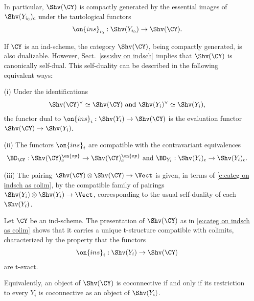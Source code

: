 \documentclass[9pt]{amsart}
\theoremstyle{definition}
\theoremstyle{remark}
\newcommand{\secref}[1]{Sect.~\ref{#1}}
\numberwithin{equation}{section}
\begin{document}
In particular, $\Shv(\CY)$ is compactly generated by the essential images of $\Shv(Y_{i_0})_c$ under the tautological
functors
$$\on{ins}_{i_0}:\Shv(Y_{i_0})\to \Shv(\CY).$$

\sssec{}  \label{sss:duality}

If $\CY$ is an ind-scheme, the category $\Shv(\CY)$, being compactly generated, is also dualizable. However,
\secref{sss:shv on indsch} implies that $\Shv(\CY)$ is canonically self-dual. This self-duality can be described 
in the following equivalent ways:

\medskip

\noindent(i) Under the identifications 
$$\Shv(\CY)^\vee\simeq \Shv(\CY) \text{ and }\Shv(Y_i)^\vee\simeq \Shv(Y_i),$$ 
the functor dual to $\on{ins}_i:\Shv(Y_i)\to \Shv(\CY)$ is the evaluation functor $\Shv(\CY)\to \Shv(Y_i)$.

\medskip

\noindent(ii) The functors $\on{ins}_i$ are compatible with the contravariant equivalences
$$\BD_\CY:\Shv(\CY)^{\on{op}}_c\to \Shv(\CY)^{\on{op}}_c \text{ and } \BD_{Y_i}:\Shv(Y_i)_c\to \Shv(Y_i)_c.$$

\medskip

\noindent(iii) The pairing $\Shv(\CY)\otimes \Shv(\CY)\to \Vect$ is given, in terms of \eqref{e:categ on indsch as colim},
by the compatible family of pairings $\Shv(Y_i)\otimes \Shv(Y_i)\to \Vect$, corresponding to the usual self-duality of
each $\Shv(Y_i)$.



\sssec{}  \label{sss:t ind-sch}

Let $\CY$ be an ind-scheme. The presentation of $\Shv(\CY)$ as in \eqref{e:categ on indsch as colim}
shows that it carries a unique t-structure compatible with colimits, characterized by the property that the
functors 
$$\on{ins}_i:\Shv(Y_i)\to \Shv(\CY)$$
are t-exact.

\medskip

Equivalently, an object of $\Shv(\CY)$ is coconnective if and only if its restriction to every $Y_i$ is coconnective
as an object of $\Shv(Y_i)$. 
\end{document}
